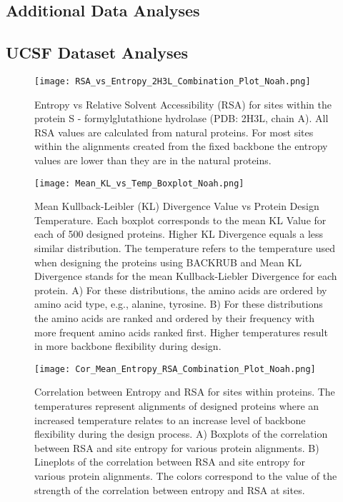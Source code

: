 \documentclass[12pt]{article}
\begin{document}
\subsection{Additional Data Analyses}


\subsection{UCSF Dataset Analyses}
\label{UCSF}

\begin{figure}[H]
\centering
\centerline{\texttt{[image: RSA\_vs\_Entropy\_2H3L\_Combination\_Plot\_Noah.png]}}
\caption{Entropy vs Relative Solvent Accessibility (RSA) for sites within the protein S - formylglutathione hydrolase (PDB: 2H3L, chain A). All RSA values are calculated from natural proteins. For most sites within the alignments created from the fixed backbone the entropy values are lower than they are in the natural proteins.}
\label{Entropy_Sites_Noah}
\end{figure}

\begin{figure}[H]
\centerline{\texttt{[image: Mean\_KL\_vs\_Temp\_Boxplot\_Noah.png]}}
\caption{Mean Kullback-Leibler (KL) Divergence Value vs Protein Design Temperature. Each boxplot corresponds to the mean KL Value for each of 500 designed proteins. Higher KL Divergence  equals a less similar distribution. The temperature refers to the temperature used when designing the proteins using BACKRUB and Mean KL Divergence stands for the mean Kullback-Liebler Divergence for each protein.  A) For these distributions, the amino acids are ordered by amino acid type, e.g., alanine, tyrosine. B) For these distributions the amino acids are ranked and ordered by their frequency with more frequent amino acids ranked first. Higher temperatures result in more backbone flexibility during design.}
\label{NoahAADisFig1}
\end{figure}

\begin{figure}[H]
\centering
\centerline{\texttt{[image: Cor\_Mean\_Entropy\_RSA\_Combination\_Plot\_Noah.png]}}
\caption{Correlation between Entropy and RSA for sites within proteins.  The temperatures represent alignments of designed proteins where an increased temperature relates to an increase level of backbone flexibility during the design process. A) Boxplots of the correlation between RSA and site entropy for various protein alignments. B) Lineplots of the correlation between RSA and site entropy for various protein alignments. The colors correspond to the value of the strength of the correlation between entropy and RSA at sites. }
\label{NoahStructureFig1}
\end{figure}
\end{document}
